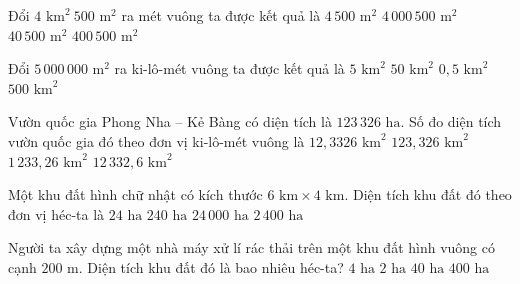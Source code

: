 \begin{ex} %
Đổi $4\text{ km}^2\ 500\text{ m}^2$ ra mét vuông ta được kết quả là
\choice
{$4\,500\text{ m}^2$}
{\True $4\,000\,500\text{ m}^2$}
{$40\,500\text{ m}^2$}
{$400\,500\text{ m}^2$}
\end{ex}

\begin{ex} %
Đổi $5\,000\,000\text{ m}^2$ ra ki-lô-mét vuông ta được kết quả là
\choice
{\True $5\text{ km}^2$}
{$50\text{ km}^2$}
{$0{,}5\text{ km}^2$}
{$500\text{ km}^2$}
\end{ex}

\begin{ex} %
Vườn quốc gia Phong Nha -- Kẻ Bàng có diện tích là $123\,326\text{ ha}$. Số đo diện tích vườn quốc gia đó theo đơn vị ki-lô-mét vuông là
\choice
{$12{,}3326\text{ km}^2$}
{$123{,}326\text{ km}^2$}
{\True $1\,233{,}26\text{ km}^2$}
{$12\,332{,}6\text{ km}^2$}
\end{ex}

\begin{ex} %
Một khu đất hình chữ nhật có kích thước $6\text{ km} \times 4\text{ km}$. Diện tích khu đất đó theo đơn vị héc-ta là
\choice
{$24\text{ ha}$}
{$240\text{ ha}$}
{$24\,000\text{ ha}$}
{\True $2\,400\text{ ha}$}
\end{ex}

\begin{ex} %
Người ta xây dựng một nhà máy xử lí rác thải trên một khu đất hình vuông có cạnh $200\text{ m}$. Diện tích khu đất đó là bao nhiêu héc-ta?
\choice
{\True $4\text{ ha}$}
{$2\text{ ha}$}
{$40\text{ ha}$}
{$400\text{ ha}$}
\end{ex}

